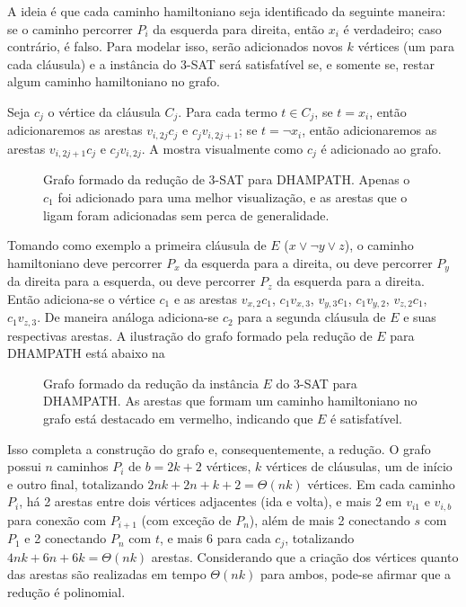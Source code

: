 A ideia é que cada caminho hamiltoniano seja identificado da seguinte maneira: se o caminho percorrer $P_i$ da esquerda para direita, então $x_i$ é verdadeiro; caso contrário, é falso. Para modelar isso, serão adicionados novos $k$ vértices (um para cada cláusula) e a instância do 3-SAT será satisfatível se, e somente se, restar algum caminho hamiltoniano no grafo.

Seja $c_j$ o vértice da cláusula $C_j$. Para cada termo $t\in C_j$, se $t=x_i$, então adicionaremos as arestas $v_{i,2j}c_{j}$ e $c_{j}v_{i,2j+1}$; se $t=\lnot x_i$, então adicionaremos as arestas $v_{i,2j+1}c_{j}$ e $c_{j}v_{i,2j}$. A  mostra visualmente como $c_j$ é adicionado ao grafo.

\begin{figure}[H]
    \centering
    
    \caption{Grafo formado da redução de 3-SAT para DHAMPATH. Apenas o $c_1$ foi adicionado para uma melhor visualização, e as arestas que o ligam foram adicionadas sem perca de generalidade.}
    \label{fig:3-sat-para-chd_total}
\end{figure}

Tomando como exemplo a primeira cláusula de $E$ ($x\lor\lnot y\lor z$), o caminho hamiltoniano deve percorrer $P_x$ da esquerda para a direita, ou deve percorrer $P_y$ da direita para a esquerda, ou deve percorrer $P_z$ da esquerda para a direita. Então adiciona-se o vértice $c_1$ e as arestas $v_{x,2}c_1$, $c_1v_{x,3}$, $v_{y,3}c_1$, $c_1v_{y,2}$, $v_{z,2}c_1$, $c_1v_{z,3}$. De maneira análoga adiciona-se $c_2$ para a segunda cláusula de $E$ e suas respectivas arestas. A ilustração do grafo formado pela redução de $E$ para DHAMPATH está abaixo na  

\begin{figure}[H]
    \centering
    
    \caption{Grafo formado da redução da instância $E$ do 3-SAT para DHAMPATH. As arestas que formam um caminho hamiltoniano no grafo está destacado em vermelho, indicando que $E$ é satisfatível.}
    \label{fig:3-sat-para-chd_total_exemplo}
\end{figure}

Isso completa a construção do grafo e, consequentemente, a redução. O grafo possui $n$ caminhos $P_i$ de $b=2k+2$ vértices, $k$ vértices de cláusulas, um de início e outro final, totalizando $2nk+2n+k+2 = \Theta(nk)$ vértices. Em cada caminho $P_i$, há 2 arestas entre dois vértices adjacentes (ida e volta), e mais 2 em $v_{i1}$ e $v_{i,b}$ para conexão com $P_{i+1}$ (com exceção de $P_n$), além de mais 2 conectando $s$ com $P_1$ e 2 conectando $P_n$ com $t$, e mais 6 para cada $c_j$, totalizando $4nk+6n+6k=\Theta(nk)$ arestas. Considerando que a criação dos vértices quanto das arestas são realizadas em tempo $\Theta(nk)$ para ambos, pode-se afirmar que a redução é polinomial.

